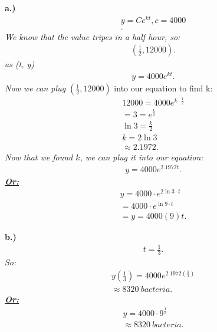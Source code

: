 \documentclass{report}
\begin{document}
    \bigbreak \noindent 
    \textbf{a.)}
    \begin{align*}
      y = Ce^{kt}, c = 4000 \\ 
    .\end{align*}
    \bigbreak \noindent 
    \textit{We know that the value tripes in a half hour, so:}
    \begin{align*}
      (\frac{1}{2}, 12000)      
    .\end{align*}
    \bigbreak \noindent 
    \textit{as (t, y)}
    \begin{align*}
      y = 4000e^{kt}
    .\end{align*}
    \bigbreak \noindent 
    \textit{Now we can plug $(\frac{1}{2},12000)$} into our equation to find k:
    \begin{align*}
      12000 = 4000e^{k \cdot \frac{1}{2}} \\
      = 3 = e^{\frac{k}{2}} \\
      \ln{3}  = \frac{k}{2} \\
      k  = 2\ln{3}  \\
      \approx 2.1972
    .\end{align*}
    \bigbreak \noindent 
    \textit{Now that we found $k$, we can plug it into our equation:}
    \begin{align*}
      y=  4000e^{2.1972 t}
    .\end{align*}
    \bigbreak \noindent 
    \textbf{\textit{\underline{Or:}}}
    \begin{align*}
      y = 4000 \cdot e^{2\ln{3}\cdot t} \\ 
      = 4000 \cdot e^{\ln{9} \cdot t} \\ 
      = y = 4000(9)t
    .\end{align*}

    \bigbreak \noindent 
    \textbf{b.)}
    \begin{align*}
      t = \frac{1}{3}     
    .\end{align*}
    \bigbreak \noindent
    \textit{So:}
    \begin{align*}
      y(\frac{1}{3}) = 4000e^{2.1972(\frac{1}{3})} \\
      \approx 8320\ bacteria
    .\end{align*}
    \bigbreak \noindent 
    \textbf{\textit{\underline{Or:}}}
    \begin{align*}
      y = 4000 \cdot 9^{\frac{1}{3}} \\
      \approx 8320\ bacteria 
    .\end{align*}
\end{document}
